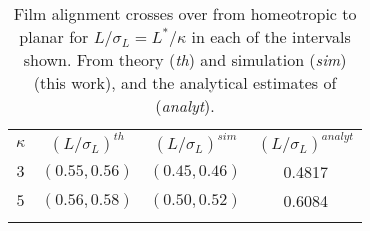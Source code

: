\documentclass[aps,pre,twocolumn,groupedaddress,showpacs]{revtex4}
\begin{document}
\begin{table}
\begin{center}
\begin{tabular}{||c|c|c|c||}
	\hhline{|t:====:t|}
	$\kappa$   &$(L/\sigma_L)^{th}$   &$(L/\sigma_L)^{sim}$   &$(L/\sigma_L)^{analyt}$ \\
	\hhline{||----||}
	$3$   &$(0.55,0.56)$   &$(0.45,0.46)$   &0.4817 \\
	$5$   &$(0.56,0.58)$   &$(0.50,0.52)$   &0.6084 \\
	\hhline{|b:====:b|}
\end{tabular}
\end{center}
\caption{Film alignment crosses over from homeotropic to planar for 
$L/\sigma_L=L^*/\kappa$ in each of the intervals shown. From theory 
({\it th}) and simulation ({\it sim}) (this work), and the analytical 
estimates of \protect\cite{Barmes:2003} ({\it analyt}).}
\label{table3} 
\end{table}
\newpage
\end{document}
